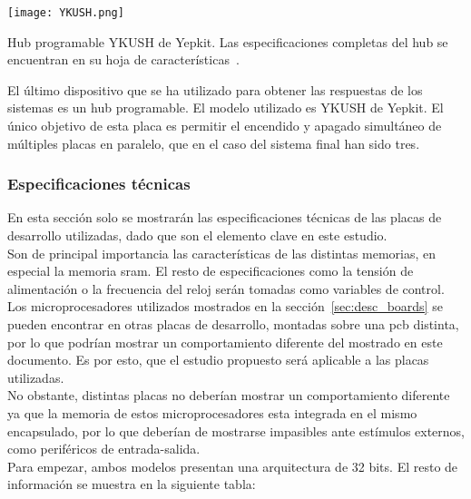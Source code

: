 \documentclass[spanish]{template/minim}
\begin{document}
\begin{marginfigure}
    \centering
    \texttt{[image: YKUSH.png]}
    \caption[Hub programable YKUSH]{Hub programable YKUSH de Yepkit. Las especificaciones completas del hub se encuentran en su hoja de características~\cite{yepkit}.\label{fig:YKUSH}}
\end{marginfigure}


El último dispositivo que se ha utilizado para obtener las respuestas de los sistemas es un hub programable. El modelo utilizado es YKUSH de Yepkit. El único objetivo de esta placa es permitir el encendido y apagado simultáneo de múltiples placas en paralelo, que en el caso del sistema final han sido tres.\\

\subsubsection{Especificaciones técnicas}\label{sec:spec_boards}

En esta sección solo se mostrarán las especificaciones técnicas de las placas de desarrollo utilizadas, dado que son el elemento clave en este estudio.\\

Son de principal importancia las características de las distintas memorias, en especial la memoria \gls{sram}. El resto de especificaciones como la tensión de alimentación o la frecuencia del reloj serán tomadas como variables de control.\\

Los microprocesadores utilizados mostrados en la sección~\ref{sec:desc_boards} se pueden encontrar en otras placas de desarrollo, montadas sobre una \gls{pcb} distinta, por lo que podrían mostrar un comportamiento diferente del mostrado en este documento. Es por esto, que el estudio propuesto será aplicable a las placas utilizadas.\\

No obstante, distintas placas no deberían mostrar un comportamiento diferente ya que la memoria de estos microprocesadores esta integrada en el mismo encapsulado, por lo que deberían de mostrarse impasibles ante estímulos externos, como periféricos de entrada-salida.\\

Para empezar, ambos modelos presentan una arquitectura de 32 bits. El resto de información se muestra en la siguiente tabla:
\end{document}
